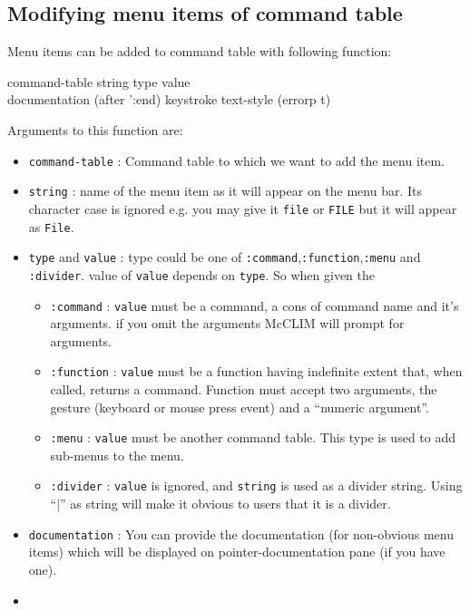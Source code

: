 \subsection{Modifying menu items of command table}
\label{modifying-menu-items}

Menu items can be added to command table with following function:

 {command-table string type value
  \\\key documentation (after ':end) keystroke text-style (errorp t)}

Arguments to this function are:
\begin{itemize}
\item
  \texttt{command-table} : Command table to which we want to add the menu item.
\item
  \texttt{string} : name of the menu item as it will appear on the
  menu bar. Its character case is ignored e.g. you may give it
  \texttt{file} or \texttt{FILE} but it will appear as \texttt{File}.
\item
  \texttt{type} and \texttt{value} : type could be one of
  \texttt{:command},\texttt{:function},\texttt{:menu} and
  \texttt{:divider}. value of \texttt{value} depends on
  \texttt{type}. So when given the
  \begin{itemize}
  \item
    \texttt{:command} : \texttt{value} must be a command, a cons of
    command name and it's arguments. if you omit the arguments McCLIM
    will prompt for arguments.
  \item
    \texttt{:function} : \texttt{value} must be a function having
    indefinite extent that, when called, returns a command. Function
    must accept two arguments, the gesture (keyboard or mouse press
    event) and a ``numeric argument''.
  \item
    \texttt{:menu} : \texttt{value} must be another command
    table. This type is used to add sub-menus to the menu.
  \item
    \texttt{:divider} : \texttt{value} is ignored, and \texttt{string}
    is used as a divider string. Using ``|'' as string will make it
    obvious to users that it is a divider.
  \end{itemize}
\item
  \texttt{documentation} : You can provide the documentation (for
  non-obvious menu items) which will be displayed on
  pointer-documentation pane (if you have one).
\item

\end{itemize}
